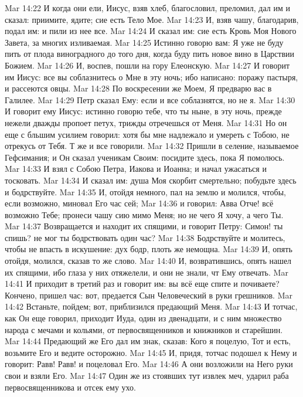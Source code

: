 \rsbpar\vs Mar 14:22 И когда они ели, Иисус, взяв хлеб, благословил, преломил, дал им и сказал: приимите, ядите; сие есть Тело Мое.
\vs Mar 14:23 И, взяв чашу, благодарив, подал им: и пили из нее все.
\vs Mar 14:24 И сказал им: сие есть Кровь Моя Нового Завета, за многих изливаемая.
\vs Mar 14:25 Истинно говорю вам: Я уже не буду пить от плода виноградного до того дня, когда буду пить новое вино в Царствии Божием.
\rsbpar\vs Mar 14:26 И, воспев, пошли на гору Елеонскую.
\vs Mar 14:27 И говорит им Иисус: все вы соблазнитесь о Мне в эту ночь; ибо написано: поражу пастыря, и рассеются овцы.
\vs Mar 14:28 По воскресении же Моем, Я предварю вас в Галилее.
\vs Mar 14:29 Петр сказал Ему: если и все соблазнятся, но не я.
\vs Mar 14:30 И говорит ему Иисус: истинно говорю тебе, что ты ныне, в эту ночь, прежде нежели дважды пропоет петух, трижды отречешься от Меня.
\vs Mar 14:31 Но он еще с бльшим усилием говорил: хотя бы мне надлежало и умереть с Тобою, не отрекусь от Тебя. Т же и все говорили.
\rsbpar\vs Mar 14:32 Пришли в селение, называемое Гефсимания; и Он сказал ученикам Своим: посидите здесь, пока Я помолюсь.
\vs Mar 14:33 И взял с Собою Петра, Иакова и Иоанна; и начал ужасаться и тосковать.
\vs Mar 14:34 И сказал им: душа Моя скорбит смертельно; побудьте здесь и бодрствуйте.
\vs Mar 14:35 И, отойдя немного, пал на землю и молился, чтобы, если возможно, миновал Его час сей;
\vs Mar 14:36 и говорил: Авва Отче! всё возможно Тебе; пронеси чашу сию мимо Меня; но не чего Я хочу, а чего Ты.
\vs Mar 14:37 Возвращается и находит их спящими, и говорит Петру: Симон! ты спишь? не мог ты бодрствовать один час?
\vs Mar 14:38 Бодрствуйте и молитесь, чтобы не впасть в искушение: дух бодр, плоть же немощна.
\vs Mar 14:39 И, опять отойдя, молился, сказав то же слово.
\vs Mar 14:40 И, возвратившись, опять нашел их спящими, ибо глаза у них отяжелели, и они не знали, чт Ему отвечать.
\vs Mar 14:41 И приходит в третий раз и говорит им: вы всё еще спите и почиваете? Кончено, пришел час: вот, предается Сын Человеческий в руки грешников.
\vs Mar 14:42 Встаньте, пойдем; вот, приблизился предающий Меня.
\rsbpar\vs Mar 14:43 И тотчас, как Он еще говорил, приходит Иуда, один из двенадцати, и с ним множество народа с мечами и кольями, от первосвященников и книжников и старейшин.
\vs Mar 14:44 Предающий же Его дал им знак, сказав: Кого я поцелую, Тот и есть, возьмите Его и ведите осторожно.
\vs Mar 14:45 И, придя, тотчас подошел к Нему и говорит: Равв! Равв! и поцеловал Его.
\vs Mar 14:46 А они возложили на Него руки свои и взяли Его.
\vs Mar 14:47 Один же из стоявших тут извлек меч, ударил раба первосвященникова и отсек ему ухо.
